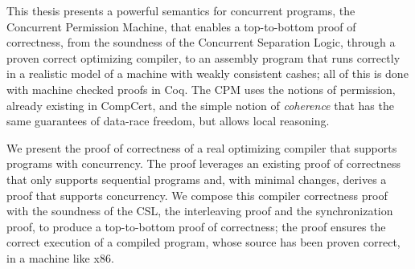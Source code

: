 
This thesis presents a powerful semantics for concurrent programs, the Concurrent Permission Machine, that enables a top-to-bottom proof of correctness, 
from the soundness of the Concurrent Separation Logic, through a proven correct optimizing compiler, to an assembly program that runs correctly in a realistic model of a machine with weakly consistent cashes; all of this is done with machine checked proofs in Coq. The CPM uses the notions of permission, already existing in CompCert, and the simple notion of \emph{coherence} that has the same guarantees of data-race freedom, but allows local reasoning.  

We present the proof of correctness of a real optimizing compiler that supports programs with concurrency. The proof leverages an existing proof of correctness that only supports sequential programs and, with minimal changes, derives a proof that supports concurrency. We compose this compiler correctness proof with the soundness of the CSL, the interleaving proof and the synchronization proof, to produce a top-to-bottom proof of correctness; the proof ensures the correct execution of a compiled program, whose source has been proven correct, in a machine like x86. 

%
